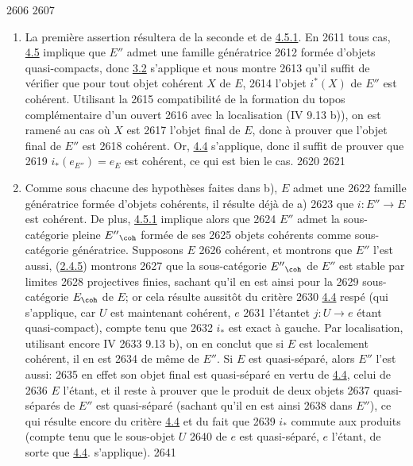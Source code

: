   2606	
  2607	\begin{enumerate}
  2608	\renewcommand{\theenumi}{\alph{enumi}}
  2609	\renewcommand{\labelenumi}{\theenumi)}
  2610	\item La première assertion résultera de la seconde et de \hyperref[VI.lem4.5.1]{4.5.1}. En
  2611	  tous cas, \hyperref[VI.cor4.5]{4.5} implique que $E''$ admet une famille génératrice
  2612	  formée d'objets quasi-compacts, donc \hyperref[VI.prop3.2]{3.2} s'applique et nous montre
  2613	  qu'il suffit de vérifier que pour tout objet cohérent $X$ de $E$,
  2614	  l'objet $i^{\ast}(X)$ de $E''$ est cohérent. Utilisant la
  2615	  compatibilité de la formation du topos complémentaire d'un ouvert
  2616	  avec la localisation (IV 9.13 b)), on est ramené au cas où $X$ est
  2617	  l'objet final de $E$, donc à prouver que l'objet final de $E''$ est
  2618	  cohérent. Or, \hyperref[VI.cor4.4]{4.4} s'applique, donc il suffit de prouver que
  2619	  $i_{\ast}(e_{E''}) = e_E$ est cohérent, ce qui est bien le cas.
  2620	
  2621	\item Comme sous chacune des hypothèses faites dans b), $E$ admet une
  2622	  famille génératrice formée d'objets cohérents, il résulte déjà de a)
  2623	  que $i : E'' \to E$ est cohérent. De plus, \hyperref[VI.lem4.5.1]{4.5.1} implique alors que
  2624	  $E''$ admet la sous-catégorie pleine ${E''}_{\coh}$ formée de ses
  2625	  objets cohérents comme sous-catégorie génératrice. Supposons $E$
  2626	  cohérent, et montrons que $E''$ l'est aussi, \ie (\hyperref[VI.subsubsec2.4.5]{2.4.5}) montrons
  2627	  que la sous-catégorie ${E''}_{\coh}$ de $E''$ est stable par limites
  2628	  projectives finies, sachant qu'il en est ainsi pour la
  2629	  sous-catégorie $E_{\coh}$ de $E$; or cela résulte aussitôt du critère
  2630	  \hyperref[VI.cor4.4]{4.4} respé (qui s'applique, car $U$ est maintenant cohérent, $e$
  2631	  l'étant\pageoriginale et $j : U \to e$ étant quasi-compact), compte tenu que
  2632	  $i_{\ast}$ est exact à gauche. Par localisation, utilisant encore IV
  2633	  9.13 b), on en conclut que si $E$ est localement cohérent, il en est
  2634	  de même de $E''$. Si $E$ est quasi-séparé, alors $E''$ l'est aussi:
  2635	  en effet son objet final est quasi-séparé en vertu de \hyperref[VI.cor4.4]{4.4}, celui de
  2636	  $E$ l'étant, et il reste à prouver que le produit de deux objets
  2637	  quasi-séparés de $E''$ est quasi-séparé (sachant qu'il en est ainsi
  2638	  dans $E''$), ce qui résulte encore du critère \hyperref[VI.cor4.4]{4.4} et du fait que
  2639	  $i_{\ast}$ commute aux produits (compte tenu que le sous-objet $U$
  2640	  de $e$ est quasi-séparé, $e$ l'étant, de sorte que \hyperref[VI.cor4.4]{4.4}. s'applique).
  2641	\end{enumerate}
